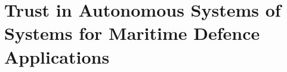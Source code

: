

\chapter{Trust in Autonomous Systems of Systems for Maritime Defence Applications} 
\label{Chapter\thechapter}



